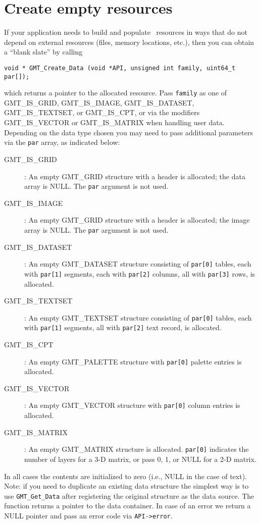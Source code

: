 \documentclass[11pt]{report}
\begin{document}
\section{Create empty resources}
\label{sec:create}

If your application needs to build and populate \GMT\ resources in ways that do
not depend on external resources (files, memory locations, etc.), then you
can obtain a ``blank slate'' by calling

\begin{verbatim}
void * GMT_Create_Data (void *API, unsigned int family, uint64_t par[]);
\end{verbatim}
which returns a pointer to the allocated resource.
Pass \texttt{family} as one of GMT\_IS\_GRID, GMT\_IS\_IMAGE, GMT\_IS\_DATASET, GMT\_IS\_TEXTSET, or GMT\_IS\_CPT,
or via the modifiers GMT\_IS\_VECTOR or GMT\_IS\_MATRIX when handling user data.
Depending on the data type chosen you may need to pass additional parameters via
the \texttt{par} array, as indicated below:
\begin{description}
	\item [GMT\_IS\_GRID]: An empty GMT\_GRID structure with a header is
	allocated; the data array is NULL.  The \texttt{par} argument is not used.
	\item [GMT\_IS\_IMAGE]: An empty GMT\_GRID structure with a header is
	allocated; the image array is NULL.  The \texttt{par} argument is not used.
	\item [GMT\_IS\_DATASET]: An empty GMT\_DATASET structure consisting of
	\texttt{par[0]} tables, each with \texttt{par[1]} segments, each with
	\texttt{par[2]} columns, all with \texttt{par[3]} rows, is allocated.
	\item [GMT\_IS\_TEXTSET]: An empty GMT\_TEXTSET structure consisting of
	\texttt{par[0]} tables, each with \texttt{par[1]} segments,
	all with \texttt{par[2]} text record, is allocated.
	\item [GMT\_IS\_CPT]: An empty GMT\_PALETTE structure with \texttt{par[0]}
	palette entries is allocated.
	\item [GMT\_IS\_VECTOR]: An empty GMT\_VECTOR structure with \texttt{par[0]}
	column entries is allocated.
	\item [GMT\_IS\_MATRIX]: An empty GMT\_MATRIX structure is allocated.
	\texttt{par[0]} indicates the number of layers for a 3-D matrix, or pass 0, 1, or
	NULL for a 2-D matrix.
	
\end{description}
In all cases the contents are initialized to zero (i.e., NULL in the case of text).
Note: if you need to
duplicate an existing data structure the simplest way is to use \texttt{GMT\_Get\_Data}
after registering the original structure as the data source.
The function returns a pointer to the data container. In case of an error we return a
NULL pointer and pass an error code via \texttt{API->error}.
\end{document}

